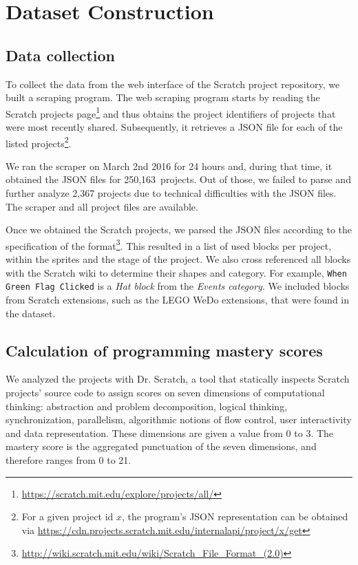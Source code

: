 \documentclass[10pt, conference]{IEEEtran}
\newcommand{\nPrograms}{250,163}
\newcommand{\fenia}[1]{\emph{\color{blue}Fenia says: #1}}
\begin{document}
\section{Dataset Construction}
\label{dataset}

\subsection{Data collection}
To collect the data from the web interface of the Scratch project repository, we built a scraping program.
The web scraping program starts by reading the Scratch projects page\footnote{\label{scratchpublic}\url{https://scratch.mit.edu/explore/projects/all/}} and thus obtains the project identifiers of projects that were most recently shared.
Subsequently, it retrieves a JSON file for each of the listed projects\footnote{For a given project id $x$, the program's JSON representation can be obtained via \url{https://cdn.projects.scratch.mit.edu/internalapi/project/x/get}}.

We ran the scraper on March 2nd 2016 for 24 hours and, during that time, it obtained the JSON files for \nPrograms~projects. Out of those, we failed to parse and further analyze 2,367 projects due to technical difficulties with the JSON files.
The scraper and all project files are available\footnotemark[\ref{dataseturl}].

Once we obtained the Scratch projects, we parsed the JSON files according to the specification of the format\footnote{\url{http://wiki.scratch.mit.edu/wiki/Scratch_File_Format_(2.0)}}.
This resulted in a list of used blocks per project, within the sprites and the stage of the project.
We also cross referenced all blocks with the Scratch wiki to determine their shapes and category.
For example, \texttt{When Green Flag Clicked} is a \emph{Hat block} from the \emph{Events category}.
We included blocks from Scratch extensions, such as the LEGO WeDo extensions, that were found in the dataset.

\subsection{Calculation of programming mastery scores}
We analyzed the projects with Dr. Scratch, a tool that statically inspects Scratch projects' source code to assign scores on seven dimensions of computational thinking: abstraction and problem decomposition, logical thinking, synchronization, parallelism, algorithmic notions of flow control, user interactivity and data representation. These dimensions are given a value from 0 to 3. The mastery score is the aggregated punctuation of the seven dimensions, and therefore ranges from 0 to 21.
\end{document}
